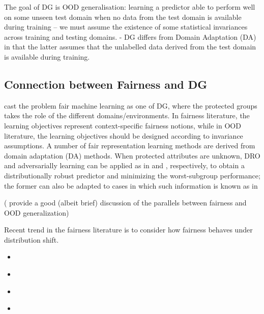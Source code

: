 %
The goal of DG is OOD generalisation: learning a predictor able to perform well on some unseen test
domain when no data from the test domain is available during training -- we must assume the 
existence of some statistical invariances across training and testing domains.
%
- DG differs from Domain Adaptation (DA) in that the latter assumes that the unlabelled data derived 
from the test domain is available during training.


\subsection{Connection between Fairness and DG}\label{ssec:fairml-dg-cxn}
\citet{creager2021environment} cast the problem fair machine learning as one of DG,
where the protected groups takes the role of the different domains/environments. In fairness
literature, the learning objectives represent context-specific fairness notions,
while in OOD literature, the learning objectives should be designed according to invariance 
assumptions.
%
A number of fair representation learning methods \citep{edwards2015censoring, madras2018learning}
are derived from domain adaptation (DA) methods.
When protected attributes are unknown, DRO and adversarially learning can be applied as in 
\citet{hashimoto2018fairness} and \citet{lahoti2020fairness}, respectively, to obtain a 
distributionally robust predictor and minimizing the worst-subgroup performance; the former can
also be adapted to cases in which such information is known as in \citet{sagawa2019distributionally} 

(\citep{krueger2021out} provide a good (albeit brief) discussion of the parallels between fairness and OOD
generalization)

Recent trend in the fairness literature is to consider how fairness behaves under distribution
shift.
%
\begin{itemize}
  \item \cite{schrouff2022diagnosing}
  \item \cite{schrouff2022maintaining}
  \item \cite{singh2021fairness}
  \item \cite{slack2020fairness}

\end{itemize}


